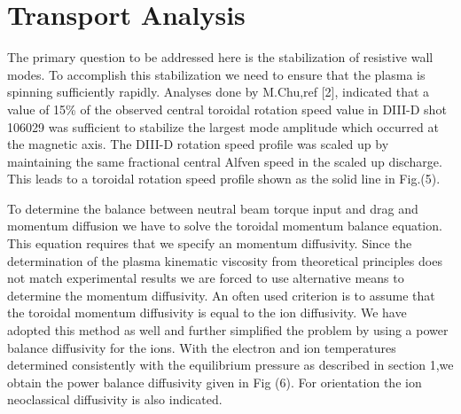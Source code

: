          \begin{center}
        \pagebreak
 
          \end{center}
        \pagebreak






       \section{Transport Analysis}
       The primary question to be addressed here is the stabilization
       of resistive wall modes. To accomplish this stabilization we
       need to ensure that the plasma is spinning sufficiently
       rapidly. Analyses done by M.Chu,ref [2], indicated that a value of 15\% 
       of the observed central toroidal rotation speed value in DIII-D
       shot 106029 was sufficient to stabilize the largest mode
       amplitude which occurred at the magnetic axis. The DIII-D rotation speed 
       profile was scaled up by maintaining the same fractional
       central Alfven 
       speed in the scaled up discharge. This leads to a toroidal
       rotation speed profile shown  as the solid line in Fig.(5).

       To determine the balance between neutral beam torque input and
       drag and momentum diffusion we have to solve the toroidal
       momentum balance equation. This equation requires that we
       specify an momentum diffusivity. Since the determination of 
       the plasma kinematic viscosity from theoretical principles
       does not match experimental results we are forced to use
       alternative means to determine the momentum diffusivity. An
       often used criterion is to assume that the toroidal momentum
       diffusivity is equal to the ion diffusivity. We have adopted
       this method as well and further simplified the problem by using 
       a power balance diffusivity for the ions. With the electron and 
       ion temperatures determined consistently with the equilibrium
       pressure as described in section 1,we obtain the power  balance
       diffusivity given in Fig (6). For orientation the ion
       neoclassical diffusivity is also indicated.

